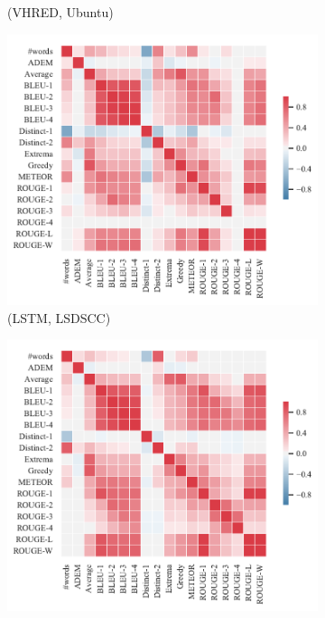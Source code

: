 \begin{figure}[htbp]
\begin{subfigure}{0.33\linewidth}
        \caption{(VHRED, Ubuntu)}
    \end{subfigure}
    \begin{subfigure}{0.33\linewidth}
        \centering
        \includegraphics[width=\linewidth]{figure/plot/heatmap/v4/pearson/lstm/lsdscc/plot.pdf}
        \caption{(LSTM, LSDSCC)}
    \end{subfigure}%
    \begin{subfigure}{0.33\linewidth}
        \centering
        \includegraphics[width=\linewidth]{figure/plot/heatmap/v4/pearson/lstm/opensub/plot.pdf}

\end{subfigure}
\end{figure}
